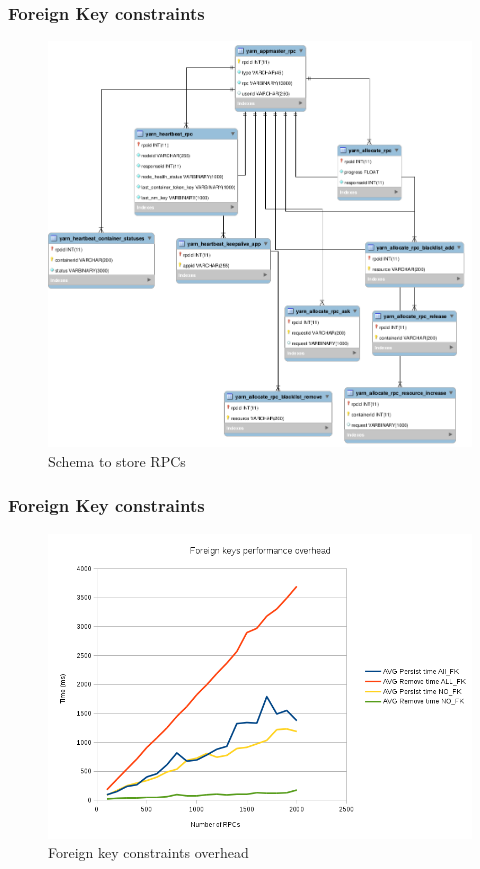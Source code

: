 \documentclass{beamer}
\begin{document}
\begin{frame}
\frametitle{Foreign Key constraints}
\begin{figure}
\centering
\includegraphics[scale=0.18]{resources/hops_yarn_ndb_schema_rpc.png}
\caption{Schema to store RPCs}
\end{figure}
\end{frame}

\begin{frame}
\frametitle{Foreign Key constraints}
\begin{figure}
\centering
\includegraphics[scale=0.4]{resources/fk_overhead.png}
\caption{Foreign key constraints overhead}
\end{figure}
\end{frame}
\end{document}

